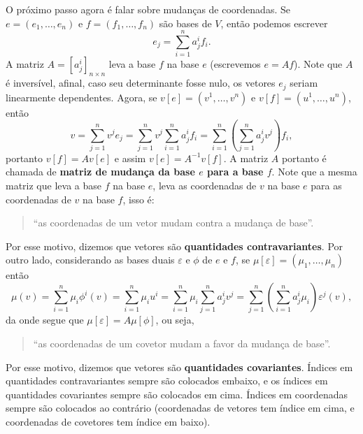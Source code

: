 O próximo passo agora é falar sobre mudanças de coordenadas. Se $e = (e_1, \dots, e_n)$ e $f = (f_1, \dots, f_n)$ são bases de $V$, então podemos escrever \begin{equation}
    e_j = \sum_{i = 1}^n a^i_j f_i.
\end{equation} A matriz $A = [a^i_j]_{n \times n}$ leva a base $f$ na base $e$ (escrevemos $e = Af$). Note que $A$ é inversível, afinal, caso seu determinante fosse nulo, os vetores $e_j$ seriam linearmente dependentes. Agora, se $v[e] = (v^1, \dots, v^n)$ e $v[f] = (u^1, \dots, u^n)$, então \begin{equation}
    v = \sum_{j = 1}^n v^j e_j = \sum_{j = 1}^n v^j \sum_{i = 1}^n a^i_j f_i = \sum_{i = 1}^n \left(\sum_{j = 1}^n a^i_j v^j\right) f_i,
\end{equation} portanto $v[f] = Av[e]$ e assim $v[e] = A^{-1}v[f]$. A matriz $A$ portanto é chamada de \textbf{matriz de mudança da base $e$ para a base $f$}. Note que a mesma matriz que leva a base $f$ na base $e$, leva as coordenadas de $v$ na base $e$ para as coordenadas de $v$ na base $f$, isso é: \begin{quotation}
    ``as coordenadas de um vetor mudam contra a mudança de base''.
\end{quotation} Por esse motivo, dizemos que vetores são \textbf{quantidades contravariantes}. Por outro lado, considerando as bases duais $\varepsilon$ e $\phi$ de $e$ e $f$, se $\mu[\varepsilon] = (\mu_1, \dots, \mu_n)$ então \begin{equation}
    \mu(v) = \sum_{i = 1}^n \mu_i \phi^i(v) = \sum_{i = 1}^n \mu_i u^i = \sum_{i = 1}^n \mu_i \sum_{j = 1}^n a^i_j v^j = \sum_{j = 1}^n \left(\sum_{i = 1}^n a^i_j \mu_i\right)\varepsilon^j(v),
\end{equation} da onde segue que $\mu[\varepsilon] = A\mu[\phi]$, ou seja, \begin{quotation}
    ``as coordenadas de um covetor mudam a favor da mudança de base''.
\end{quotation} Por esse motivo, dizemos que vetores são \textbf{quantidades covariantes}. Índices em quantidades contravariantes sempre são colocados embaixo, e os índices em quantidades covariantes sempre são colocados em cima. Índices em coordenadas sempre são colocados ao contrário (coordenadas de vetores tem índice em cima, e coordenadas de covetores tem índice em baixo).

